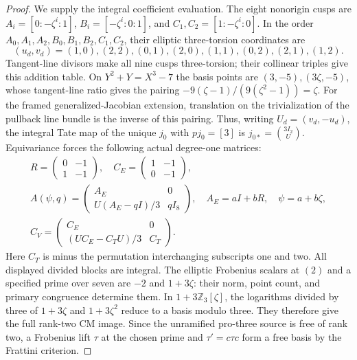 \documentclass[11pt,oneside]{article}
\begin{document}
\begin{proof}
We supply the integral coefficient evaluation.
The eight nonorigin cusps are
$A_i=[0:-\zeta^i:1]$, $B_i=[-\zeta^i:0:1]$,
and $C_1,C_2=[1:-\zeta^i:0]$.
In the order $A_0,A_1,A_2,B_0,B_1,B_2,C_1,C_2$,
their elliptic three-torsion coordinates are
\[
 (u_d,v_d)=(1,0),(2,2),(0,1),(2,0),
                 (1,1),(0,2),(2,1),(1,2).
 \tag{E18.8}
\]
Tangent-line divisors make all nine cusps three-torsion;
their collinear triples give this addition table.
On $Y^2+Y=X^3-7$ the basis points are
$(3,-5),(3\zeta,-5)$, whose tangent-line ratio gives
the pairing $-9(\zeta-1)/(9(\zeta^2-1))=\zeta$.
For the framed generalized-Jacobian extension,
translation on the trivialization of the pullback
line bundle is the inverse of this pairing.
Thus, writing $U_d=(v_d,-u_d)$, the integral
Tate map of the unique $j_0$ with $pj_0=[3]$ is
$j_{0*}=\binom{3I_2}{U}$. Equivariance forces
the following actual degree-one matrices:
\[
 \begin{gathered}
 R=\begin{pmatrix}0&-1\\1&-1\end{pmatrix},\quad
 C_E=\begin{pmatrix}1&-1\\0&-1\end{pmatrix},\\
 A(\psi,q)=
 \begin{pmatrix}A_E&0\\U(A_E-qI)/3&qI_8\end{pmatrix},
       \quad A_E=aI+bR,\quad\psi=a+b\zeta,\\
 C_V=\begin{pmatrix}C_E&0\\(UC_E-C_TU)/3&C_T\end{pmatrix}.
 \end{gathered}
 \tag{E18.9}
\]
Here $C_T$ is minus the permutation interchanging
subscripts one and two. All displayed divided
blocks are integral. The elliptic Frobenius
scalars at $(2)$ and a specified prime over seven
are $-2$ and $1+3\zeta$: their norm, point count,
and primary congruence determine them. In
$1+3\mathbb Z_3[\zeta]$, the logarithms divided
by three of $1+3\zeta$ and $1+3\zeta^2$ reduce
to a basis modulo three. They therefore give
the full rank-two CM image. Since the unramified
pro-three source is free of rank two, a Frobenius
lift $\tau$ at the chosen prime and
$\tau'=c\tau c$ form a free basis by the
Frattini criterion.


\end{proof}
\end{document}
